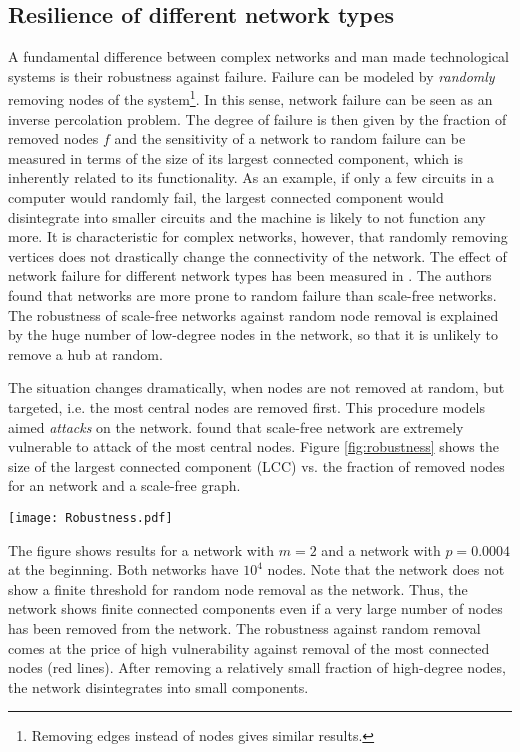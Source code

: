 \documentclass[openright,twoside,headsepline]{scrbook}
\begin{document}
\subsection{Resilience of different network types}\label{sec:resilience}
A fundamental difference between complex networks and man made technological systems is their robustness against failure.
Failure can be modeled by \emph{randomly} removing nodes of the system\footnote{Removing edges instead of nodes gives similar results.}.
In this sense, network failure can be seen as an inverse percolation problem.
The degree of failure is then given by the fraction of removed nodes $f$ and the sensitivity of a network to random failure can be measured in terms of the size of its largest connected component, which is inherently related to its functionality.
As an example, if only a few circuits in a computer would randomly fail, the largest connected component would disintegrate into smaller circuits and the machine is likely to not function any more.
It is characteristic for complex networks, however, that randomly removing vertices does not drastically change the connectivity of the network.
The effect of network failure for different network types has been measured in \citep{Albert:2000}.
The authors found that \ER networks are more prone to random failure than scale-free networks.
The robustness of scale-free networks against random node removal is explained by the huge number of low-degree nodes in the network, so that it is unlikely to remove a hub at random.

The situation changes dramatically, when nodes are not removed at random, but targeted, i.e. the most central nodes are removed first.
This procedure models aimed \emph{attacks} on the network.
\citeauthor{Albert:2000} found that scale-free network are extremely vulnerable to attack of the most central nodes.
Figure \ref{fig:robustness} shows the size of the largest connected component (LCC) vs. the fraction of removed nodes for an \ER network and a scale-free \BA graph.
%
\begin{SCfigure}
\texttt{[image: Robustness.pdf]}
\caption{Robustness of a \BA  (BA) network and an \ER  (ER) graph to random failure (grey dashed line) and targeted attack (red).
Red lines represent the size of the LCC under targeted removal of the most connected nodes.
The size of the LCC remains finite for the \BA network under random failure even for a large number of removed nodes.
From \citet{Albert:2000}.
}
\label{fig:robustness}
\end{SCfigure}
%
The figure shows results for a \BA network with $m=2$ and a \ER network with $p=0.0004$ at the beginning.
Both networks have $10^4$ nodes.
Note that the \BA network does not show a finite threshold for random node removal as the \ER network.
Thus, the network shows finite connected components even if a very large number of nodes has been removed from the network.
The robustness against random removal comes at the price of high vulnerability against removal of the most connected nodes (red lines).
After removing a relatively small fraction of high-degree nodes, the \BA network disintegrates into small components.
\end{document}
